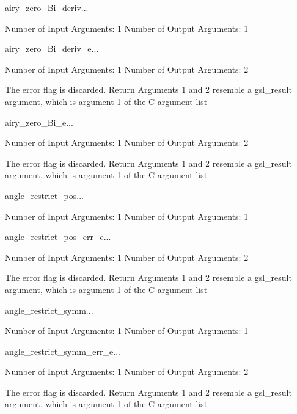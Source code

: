 \begin{funcdesc}{airy_zero_Bi_deriv}{...}

    Number of Input  Arguments:  1
    Number of Output Arguments:  1
\end{funcdesc}

\begin{funcdesc}{airy_zero_Bi_deriv_e}{...}

    Number of Input  Arguments:  1
    Number of Output Arguments:  2

The error flag is discarded.
Return Arguments 1 and 2 resemble a gsl_result argument,
	which is  argument 1 of the C argument list

\end{funcdesc}

\begin{funcdesc}{airy_zero_Bi_e}{...}

    Number of Input  Arguments:  1
    Number of Output Arguments:  2

The error flag is discarded.
Return Arguments 1 and 2 resemble a gsl_result argument,
	which is  argument 1 of the C argument list

\end{funcdesc}

\begin{funcdesc}{angle_restrict_pos}{...}

    Number of Input  Arguments:  1
    Number of Output Arguments:  1
\end{funcdesc}

\begin{funcdesc}{angle_restrict_pos_err_e}{...}

    Number of Input  Arguments:  1
    Number of Output Arguments:  2

The error flag is discarded.
Return Arguments 1 and 2 resemble a gsl_result argument,
	which is  argument 1 of the C argument list

\end{funcdesc}

\begin{funcdesc}{angle_restrict_symm}{...}

    Number of Input  Arguments:  1
    Number of Output Arguments:  1
\end{funcdesc}

\begin{funcdesc}{angle_restrict_symm_err_e}{...}

    Number of Input  Arguments:  1
    Number of Output Arguments:  2

The error flag is discarded.
Return Arguments 1 and 2 resemble a gsl_result argument,
	which is  argument 1 of the C argument list

\end{funcdesc}

